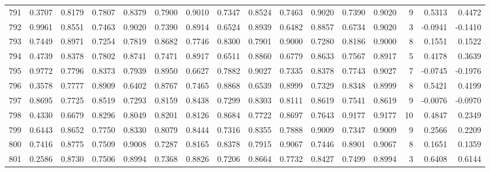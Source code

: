 \begin{tabular}{lrrrrrrrrrrrrrrr}
791 &      0.3707 &  0.8179 &  0.7807 &  0.8379 &  0.7900 &  0.9010 &  0.7347 &  0.8524 &  0.7463 &  0.9020 &   0.7390 &     0.9020 &      9 &                    0.5313 &                     0.4472 \\
792 &      0.9961 &  0.8551 &  0.7463 &  0.9020 &  0.7390 &  0.8914 &  0.6524 &  0.8939 &  0.6482 &  0.8857 &   0.6734 &     0.9020 &      3 &                   -0.0941 &                    -0.1410 \\
793 &      0.7449 &  0.8971 &  0.7254 &  0.7819 &  0.8682 &  0.7746 &  0.8300 &  0.7901 &  0.9000 &  0.7280 &   0.8186 &     0.9000 &      8 &                    0.1551 &                     0.1522 \\
794 &      0.4739 &  0.8378 &  0.7802 &  0.8741 &  0.7471 &  0.8917 &  0.6511 &  0.8860 &  0.6779 &  0.8633 &   0.7567 &     0.8917 &      5 &                    0.4178 &                     0.3639 \\
795 &      0.9772 &  0.7796 &  0.8373 &  0.7939 &  0.8950 &  0.6627 &  0.7882 &  0.9027 &  0.7335 &  0.8378 &   0.7743 &     0.9027 &      7 &                   -0.0745 &                    -0.1976 \\
796 &      0.3578 &  0.7777 &  0.8909 &  0.6402 &  0.8767 &  0.7465 &  0.8868 &  0.6539 &  0.8999 &  0.7329 &   0.8348 &     0.8999 &      8 &                    0.5421 &                     0.4199 \\
797 &      0.8695 &  0.7725 &  0.8519 &  0.7293 &  0.8159 &  0.8438 &  0.7299 &  0.8303 &  0.8111 &  0.8619 &   0.7541 &     0.8619 &      9 &                   -0.0076 &                    -0.0970 \\
798 &      0.4330 &  0.6679 &  0.8296 &  0.8049 &  0.8201 &  0.8126 &  0.8684 &  0.7722 &  0.8697 &  0.7643 &   0.9177 &     0.9177 &     10 &                    0.4847 &                     0.2349 \\
799 &      0.6443 &  0.8652 &  0.7750 &  0.8330 &  0.8079 &  0.8444 &  0.7316 &  0.8355 &  0.7888 &  0.9009 &   0.7347 &     0.9009 &      9 &                    0.2566 &                     0.2209 \\
800 &      0.7416 &  0.8775 &  0.7509 &  0.9008 &  0.7287 &  0.8165 &  0.8378 &  0.7915 &  0.9067 &  0.7446 &   0.8901 &     0.9067 &      8 &                    0.1651 &                     0.1359 \\
801 &      0.2586 &  0.8730 &  0.7506 &  0.8994 &  0.7368 &  0.8826 &  0.7206 &  0.8664 &  0.7732 &  0.8427 &   0.7499 &     0.8994 &      3 &                    0.6408 &                     0.6144 \\

\end{tabular}
